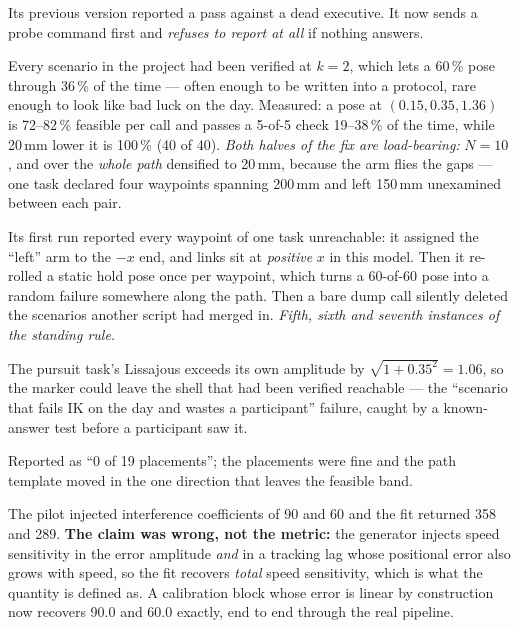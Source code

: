{Its previous version reported a pass against a dead executive. It now sends a
probe command first and \emph{refuses to report at all} if nothing answers.}

{Every scenario in the project had been verified at $k=2$, which lets a 60\,\%
pose through 36\,\% of the time --- often enough to be written into a protocol,
rare enough to look like bad luck on the day. Measured: a pose at
$(0.15, 0.35, 1.36)$ is 72--82\,\% feasible per call and passes a 5-of-5 check
19--38\,\% of the time, while 20\,mm lower it is 100\,\% (40 of 40).
\textit{Both halves of the fix are load-bearing:} $N=10$, and over the
\emph{whole path} densified to 20\,mm, because the arm flies the gaps ---
one task declared four waypoints spanning 200\,mm and left 150\,mm unexamined
between each pair.}

{Its first run reported every waypoint of one task unreachable: it assigned the
``left'' arm to the $-x$ end, and  links sit at \emph{positive}
$x$ in this model. Then it re-rolled a static hold pose once per waypoint, which
turns a 60-of-60 pose into a random failure somewhere along the path. Then a
bare dump call silently deleted the scenarios another script had merged in.
\textit{Fifth, sixth and seventh instances of the standing rule.}}

{The pursuit task's Lissajous exceeds its own amplitude by
$\sqrt{1+0.35^2} = 1.06$, so the marker could leave the shell that had been
verified reachable --- the ``scenario that fails IK on the day and wastes a
participant'' failure, caught by a known-answer test before a participant saw
it.}

{Reported as ``0 of 19 placements''; the placements were fine and the path
template moved in the one direction that leaves the feasible band.}

{The pilot injected interference coefficients of 90 and 60 and the fit returned
358 and 289. \textbf{The claim was wrong, not the metric:} the generator injects
speed sensitivity in the error amplitude \emph{and} in a tracking lag whose
positional error also grows with speed, so the fit recovers \emph{total} speed
sensitivity, which is what the quantity is defined as. A calibration block whose
error is linear by construction now recovers 90.0 and 60.0 exactly, end to end
through the real pipeline.}

